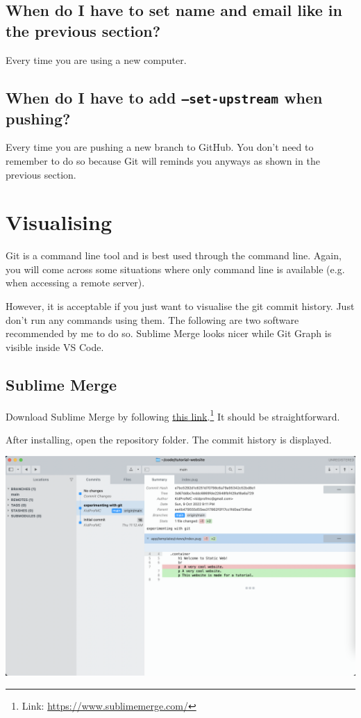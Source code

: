 \subsection*{When do I have to set name and email like in the previous section?}

Every time you are using a new computer.

\subsection*{When do I have to add \texttt{--set-upstream} when pushing?}

Every time you are pushing a new branch to GitHub. You don't need to remember to do so because Git will reminds you anyways as shown in the previous section.

\section{Visualising}
\label{sec:sublime}
Git is a command line tool and is best used through the command line. Again, you will come across some situations where only command line is available (e.g. when accessing a remote server). 

However, it is acceptable if you just want to visualise the git commit history. Just don't run any commands using them. The following are two software recommended by me to do so. Sublime Merge looks nicer while Git Graph is visible inside VS Code. 

\subsection*{Sublime Merge}

Download Sublime Merge by following \href{https://www.sublimemerge.com/}{this link}.\footnote{Link: \url{https://www.sublimemerge.com/}} It should be straightforward. 

After installing, open the repository folder. The commit history is displayed.

\begin{center}
\includegraphics[width=15cm]{images/ch3-sublimemerge.png}
\end{center}

